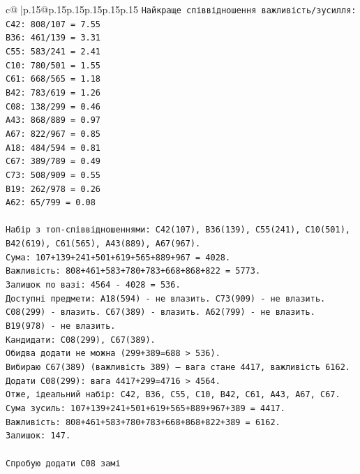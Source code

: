 \documentclass{article}
\begin{document}
{\begin{supertabular}{c@{$\;$}|p{.15\linewidth}@{}p{.15\linewidth}p{.15\linewidth}p{.15\linewidth}p{.15\linewidth}p{.15\linewidth}}
{{{\texttt{Найкраще співвідношення важливість/зусилля:} \\
\texttt{C42: 808/107 = 7.55} \\
\texttt{B36: 461/139 = 3.31} \\
\texttt{C55: 583/241 = 2.41} \\
\texttt{C10: 780/501 = 1.55} \\
\texttt{C61: 668/565 = 1.18} \\
\texttt{B42: 783/619 = 1.26} \\
\texttt{C08: 138/299 = 0.46} \\
\texttt{A43: 868/889 = 0.97} \\
\texttt{A67: 822/967 = 0.85} \\
\texttt{A18: 484/594 = 0.81} \\
\texttt{C67: 389/789 = 0.49} \\
\texttt{C73: 508/909 = 0.55} \\
\texttt{B19: 262/978 = 0.26} \\
\texttt{A62: 65/799 = 0.08} \\
\\ 
\texttt{Набір з топ{-}співвідношеннями: C42(107), B36(139), C55(241), C10(501), B42(619), C61(565), A43(889), A67(967).} \\
\texttt{Сума: 107+139+241+501+619+565+889+967 = 4028.} \\
\texttt{Важливість: 808+461+583+780+783+668+868+822 = 5773.} \\
\texttt{Залишок по вазі: 4564 {-} 4028 = 536.} \\
\texttt{Доступні предмети: A18(594) {-} не влазить. C73(909) {-} не влазить. C08(299) {-} влазить. C67(389) {-} влазить. A62(799) {-} не влазить. B19(978) {-} не влазить.} \\
\texttt{Кандидати: C08(299), C67(389).} \\
\texttt{Обидва додати не можна (299+389=688 > 536).} \\
\texttt{Вибираю C67(389) (важливість 389) — вага стане 4417, важливість 6162.} \\
\texttt{Додати C08(299): вага 4417+299=4716 > 4564.} \\
\texttt{Отже, ідеальний набір: C42, B36, C55, C10, B42, C61, A43, A67, C67.} \\
\texttt{Сума зусиль: 107+139+241+501+619+565+889+967+389 = 4417.} \\
\texttt{Важливість: 808+461+583+780+783+668+868+822+389 = 6162.} \\
\texttt{Залишок: 147.} \\
\\ 
\texttt{Спробую додати C08 замі} \\
            }
        }
    }
     \\ \\


\end{supertabular}}
\end{document}
